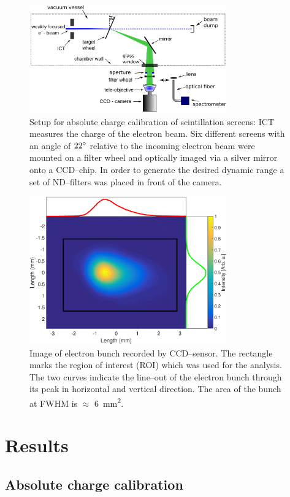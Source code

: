 \documentclass[%
preprint,
amsmath,
amssymb,
aip,
rsi, 
numerical,
floatfix,
]{revtex4-1}
\begin{document}
\begin{figure}
\includegraphics[width=8.5cm]{./Figures/Setup_V4}%
\caption{\label{fig:Setup}Setup for absolute charge calibration of scintillation screens: ICT measures the charge of the electron beam. 
Six different screens with an angle of $22\degree$ relative to the incoming electron beam were mounted on a filter wheel and optically imaged via a silver mirror onto a CCD--chip.
In order to generate the desired dynamic range a set of ND--filters was placed in front of the camera.}
\end{figure}
\begin{figure}
\includegraphics[width=8.5cm]{./Figures/electron_bunch_V2}%
\caption{\label{fig:electron_bunch}
Image of electron bunch recorded by CCD–sensor. 
The rectangle marks the region of interest (ROI) which was used for the analysis. 
The two curves indicate the line--out of the electron bunch through its peak in horizontal and vertical direction. 
The area of the bunch at FWHM is $\approx$ \SI{6}{\square\milli\meter}.}
\end{figure}

\section{\label{Res} Results}
\subsection{\label{Ac} Absolute charge calibration}
\end{document}
